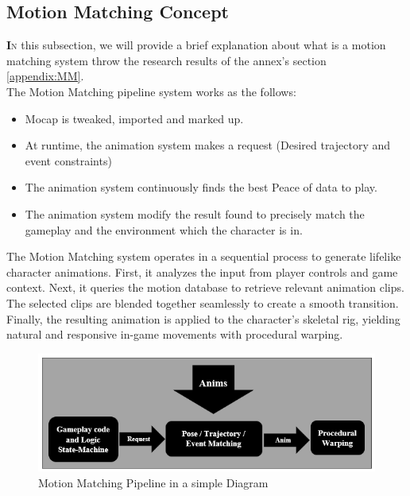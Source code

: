 \documentclass[12pt]{book}
\begin{document}
\subsection{Motion Matching Concept}
\lettrine[findent=1pt]{\textbf{I}}{n} this subsection, we will provide a brief explanation about what is a motion matching system throw the research results of the annex's section \ref{appendix:MM}.\\
The Motion Matching pipeline system works as the follows:
\begin{itemize}
    \item Mocap is tweaked, imported and marked up.
    \item At runtime, the animation system makes a request (Desired trajectory and event constraints)
    \item The animation system continuously finds the best Peace of data to play.
    \item The animation system modify the result found to precisely match the gameplay and the environment which the character is in.
\end{itemize}
The Motion Matching system operates in a sequential process to generate lifelike character animations. First, it analyzes the input from player controls and game context. Next, it queries the motion database to retrieve relevant animation clips. The selected clips are blended together seamlessly to create a smooth transition. Finally, the resulting animation is applied to the character's skeletal rig, yielding natural and responsive in-game movements with procedural warping.
\begin{figure}[!h]
    \centering
    \includegraphics[scale=1.1]{./Figures/Images/motion matching process diagram.PNG}
    \caption{Motion Matching Pipeline in a simple Diagram}
    \label{Motion Matching Pipeline in a simple Diagram}
\end{figure}
\end{document}
